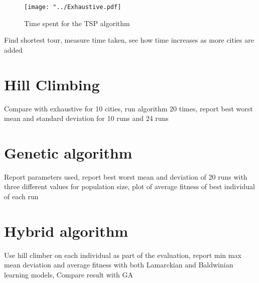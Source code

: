 \documentclass{article}
\begin{document}
\begin{figure}[H]
\begin{center}
\texttt{[image: "../Exhaustive.pdf]}
\caption{Time spent for the TSP algorithm}
\end{center}
\end{figure}

Find shortest tour, measure time taken, see how time increases as more cities are added


\section{Hill Climbing}
Compare with exhaustive for 10 cities, run algorithm 20 times, report best worst mean and standard deviation for 10 runs and 24 runs
\section{Genetic algorithm}
Report parameters used, report best worst mean and deviation of 20 runs with three different values for population size, plot of average fitness of best individual of each run
\section{Hybrid algorithm}
Use hill climber on each individual as part of the evaluation, report min max mean deviation and average fitness with both Lamarckian and Baldwinian learning models, Compare result with GA
\end{document}

